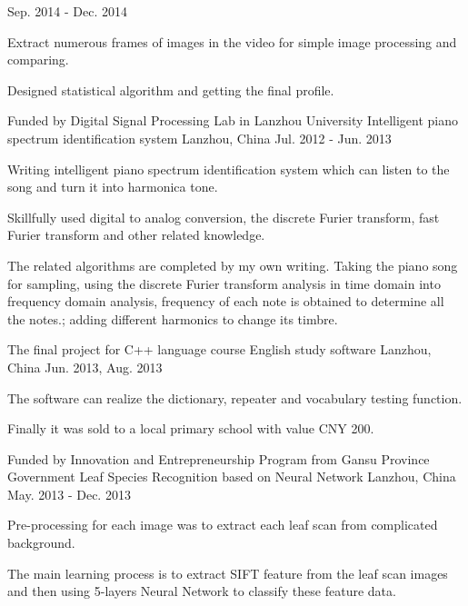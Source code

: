 \begin{cventries}
    {Sep. 2014 - Dec. 2014}
    {
      \begin{cvitems}
        \item {Extract numerous frames of images in the video for simple image processing and comparing.}
        \item {Designed statistical algorithm and getting the final profile.}
      \end{cvitems} 
    }
  \cventry
    {Funded by Digital Signal Processing Lab in Lanzhou University}
    {Intelligent piano spectrum identification system}
    {Lanzhou, China}
    {Jul. 2012 - Jun. 2013}
    {
      \begin{cvitems}
        \item {Writing intelligent piano spectrum identification system which can listen to the song and turn it into harmonica tone.}
        \item {Skillfully used digital to analog conversion, the discrete Furier transform, fast Furier transform and other related knowledge.}
        \item {The related algorithms are completed by my own writing. Taking the piano song for sampling, using the discrete Furier transform analysis in time domain into frequency domain analysis, frequency of each note is obtained to determine all the notes.; adding different harmonics to change its timbre.}
      \end{cvitems}
    }
  \cventry
    {The final project for C++ language course}
    {English study software}
    {Lanzhou, China}
    {Jun. 2013, Aug. 2013}
    {
      \begin{cvitems}
        \item {The software can realize the dictionary, repeater and vocabulary testing function.}
        \item {Finally it was sold to a local primary school with value CNY 200.}
      \end{cvitems}
    }
  \cventry
    {Funded by Innovation and Entrepreneurship Program from Gansu Province Government}
    {Leaf Species Recognition based on Neural Network}
    {Lanzhou, China}
    {May. 2013 - Dec. 2013}
    {
      \begin{cvitems}
        \item {Pre-processing for each image was to extract each leaf scan from complicated background.}
        \item {The main learning process is to extract SIFT feature from the leaf scan images and then using 5-layers Neural Network to classify these feature data.}
      \end{cvitems}
    }
\end{cventries}
